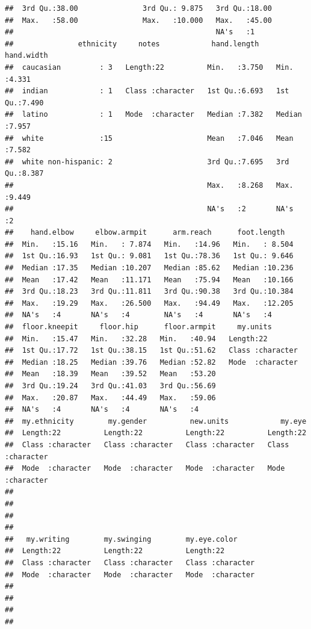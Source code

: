 \documentclass[]{article}
\begin{document}
\begin{verbatim}
##  3rd Qu.:38.00               3rd Qu.: 9.875   3rd Qu.:18.00  
##  Max.   :58.00               Max.   :10.000   Max.   :45.00  
##                                               NA's   :1      
##               ethnicity     notes            hand.length      hand.width   
##  caucasian         : 3   Length:22          Min.   :3.750   Min.   :4.331  
##  indian            : 1   Class :character   1st Qu.:6.693   1st Qu.:7.490  
##  latino            : 1   Mode  :character   Median :7.382   Median :7.957  
##  white             :15                      Mean   :7.046   Mean   :7.582  
##  white non-hispanic: 2                      3rd Qu.:7.695   3rd Qu.:8.387  
##                                             Max.   :8.268   Max.   :9.449  
##                                             NA's   :2       NA's   :2      
##    hand.elbow     elbow.armpit      arm.reach      foot.length    
##  Min.   :15.16   Min.   : 7.874   Min.   :14.96   Min.   : 8.504  
##  1st Qu.:16.93   1st Qu.: 9.081   1st Qu.:78.36   1st Qu.: 9.646  
##  Median :17.35   Median :10.207   Median :85.62   Median :10.236  
##  Mean   :17.42   Mean   :11.171   Mean   :75.94   Mean   :10.166  
##  3rd Qu.:18.23   3rd Qu.:11.811   3rd Qu.:90.38   3rd Qu.:10.384  
##  Max.   :19.29   Max.   :26.500   Max.   :94.49   Max.   :12.205  
##  NA's   :4       NA's   :4        NA's   :4       NA's   :4       
##  floor.kneepit     floor.hip      floor.armpit     my.units        
##  Min.   :15.47   Min.   :32.28   Min.   :40.94   Length:22         
##  1st Qu.:17.72   1st Qu.:38.15   1st Qu.:51.62   Class :character  
##  Median :18.25   Median :39.76   Median :52.82   Mode  :character  
##  Mean   :18.39   Mean   :39.52   Mean   :53.20                     
##  3rd Qu.:19.24   3rd Qu.:41.03   3rd Qu.:56.69                     
##  Max.   :20.87   Max.   :44.49   Max.   :59.06                     
##  NA's   :4       NA's   :4       NA's   :4                         
##  my.ethnicity        my.gender          new.units            my.eye         
##  Length:22          Length:22          Length:22          Length:22         
##  Class :character   Class :character   Class :character   Class :character  
##  Mode  :character   Mode  :character   Mode  :character   Mode  :character  
##                                                                             
##                                                                             
##                                                                             
##                                                                             
##   my.writing        my.swinging        my.eye.color      
##  Length:22          Length:22          Length:22         
##  Class :character   Class :character   Class :character  
##  Mode  :character   Mode  :character   Mode  :character  
##                                                          
##                                                          
##                                                          
## 
\end{verbatim}
\end{document}
